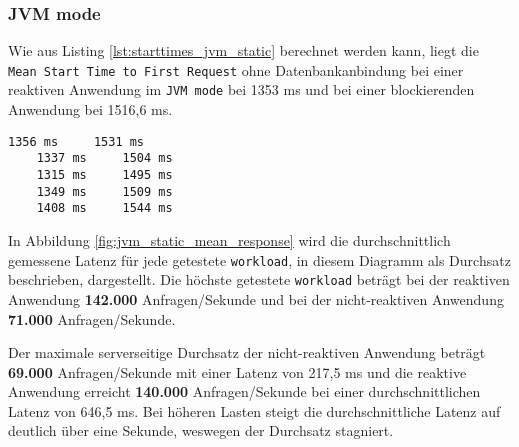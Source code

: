 \subsubsection{JVM mode}
\label{subsubsec:static_jvm_mode}
Wie aus Listing \ref{lst:starttimes_jvm_static} berechnet werden kann, liegt die \verb|Mean Start Time to First Request|
ohne Datenbankanbindung bei einer reaktiven Anwendung im \verb|JVM mode| bei 1353 ms und bei einer
blockierenden Anwendung bei 1516,6 ms.
\begin{lstlisting}[caption=Startzeiten im JVM mode mit statischen Ressourcen, captionpos=b, label=lst:starttimes_jvm_static]
    1356 ms     1531 ms
    1337 ms     1504 ms
    1315 ms     1495 ms
    1349 ms     1509 ms
    1408 ms     1544 ms
\end{lstlisting}

In Abbildung \ref{fig:jvm_static_mean_response} wird die durchschnittlich gemessene Latenz für jede getestete \verb|workload|,
in diesem Diagramm als Durchsatz beschrieben, dargestellt.
Die höchste getestete \verb|workload| beträgt bei der reaktiven Anwendung \textbf{142.000} Anfragen/Sekunde und bei der
nicht-reaktiven Anwendung \textbf{71.000} Anfragen/Sekunde.

Der maximale serverseitige Durchsatz der nicht-reaktiven Anwendung beträgt \textbf{69.000} Anfragen/Sekunde mit einer
Latenz von 217,5 ms und
die reaktive Anwendung erreicht \textbf{140.000} Anfragen/Sekunde bei einer durchschnittlichen Latenz von 646,5 ms.
Bei höheren Lasten steigt die durchschnittliche Latenz auf deutlich über eine Sekunde, weswegen der Durchsatz stagniert.

